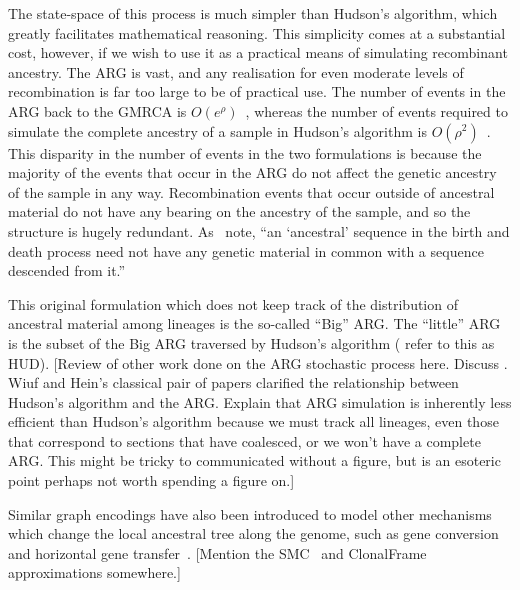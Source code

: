 \documentclass{article}
\begin{document}
The state-space of this process is much simpler than Hudson's algorithm, which
greatly facilitates mathematical reasoning. This simplicity comes at a
substantial cost, however, if we wish to use it as a practical means of
simulating recombinant ancestry. The ARG is vast, and any realisation
for even moderate levels of recombination is far too large to be of practical
use. The number of events in the ARG back to the GMRCA
is $O(e^\rho)$~\citep{griffiths1997ancestral}, whereas the number
of events required to simulate the complete ancestry of a sample
in Hudson's algorithm is
$O(\rho^2)$~\citep{hein2004gene,baumdicker2021efficient}.
This disparity in the number of events in the two formulations is
because the majority of the events that occur in the ARG do
not affect the genetic ancestry of the sample in any way. Recombination
events that occur outside of ancestral material do not have any bearing
on the ancestry of the sample, and so the structure is hugely redundant.
As~\cite{wiuf1999recombination} note,
``an `ancestral' sequence in the birth and death process
need not have any genetic material in common with a
sequence descended from it.''


This original formulation which does not keep track of the distribution
of ancestral material among lineages is the so-called ``Big'' ARG.
The ``little'' ARG is the subset of the Big ARG traversed by
Hudson's algorithm (\citet{wiuf1999recombination} refer to this as HUD).
[Review of other work done on the ARG stochastic process here.
Discuss \citet{wiuf1999ancestry}. Wiuf and Hein's classical pair of papers
clarified the relationship between Hudson's algorithm and the ARG.
Explain that ARG simulation is inherently less efficient than Hudson's
algorithm because we must track all lineages, even those that correspond
to sections that have coalesced, or we won't have a complete ARG.
This might be tricky to communicated without a figure, but is an
esoteric point perhaps not worth spending a figure on.]

Similar graph encodings have also been introduced to model other mechanisms
which change the local ancestral tree along the genome, such as gene
conversion~\citep{wiuf2000coalescent} and
horizontal gene transfer~\citep{baumdicker2014infinitely}.
[Mention the
SMC~\citep{mcvean2005approximating,marjoram2006fast}
and ClonalFrame~\citep{didelot2007inference} approximations somewhere.]
\end{document}
